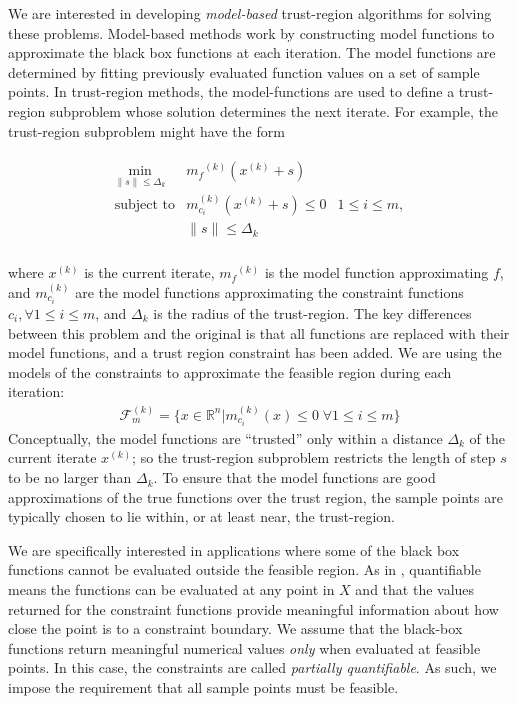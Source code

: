 \documentclass{article}
\theoremstyle{case}
\numberwithin{theorem}{subsection}
\newcommand{\dk}{\Delta_k}
\newcommand{\feasiblek}{{\mathcal F_m^{(k)}}}
\newcommand{\mcik}{{{m}^{(k)}_{c_i}}}
\newcommand{\mfk}{{{m}_f}^{(k)}}
\newcommand{\Rn}{\mathbb R^n}
\newcommand{\xk}{x^{(k)}}
\begin{document}
We are interested in developing {\em model-based} trust-region algorithms for solving these problems.
Model-based methods work by constructing model functions to approximate the black box functions at each iteration.
The model functions are determined by fitting previously evaluated function values on a set of sample points.
In trust-region methods, the model-functions are used to define a trust-region subproblem whose solution determines the next iterate.
For example, the trust-region subproblem might have the form

\begin{align*}
\begin{array}{ccl} \min_{\|s\| \le \dk}
 & \mfk \left(\xk+s\right) \\
\mbox{subject to} & \mcik\left(\xk + s\right) \le 0 & 1 \le i \le m, \\
& \|s\| \le \dk \\
\end{array}
\end{align*}

where $\xk$ is the current iterate, $\mfk$ is the model function approximating $f$, 
and $\mcik$ are the model functions approximating the constraint functions $c_i, \forall 1 \le i \le m$, and $\dk$ is the radius of the trust-region.
The key differences between this problem and the original is that all functions are replaced with their model functions, and a trust region constraint has been added.
We are using the models of the constraints to approximate the feasible region during each iteration:
\begin{align}
\feasiblek = \{x \in \Rn | \mcik(x) \le 0 \; \forall 1 \le i \le m \} \label{define_feasiblek}
\end{align}
Conceptually, the model functions are ``trusted'' only within a distance $ \dk $ of the current iterate $\xk$; so the trust-region subproblem restricts the length of step $s$ to be no larger than $\dk$.
To ensure that the model functions are good approximations of the true functions over the trust region, the sample points are typically chosen to lie within, or at least near, the trust-region.


We are specifically interested in applications where some of the black box functions cannot be evaluated outside the feasible region.
As in \cite{digabel2015taxonomy}, quantifiable means the functions can be evaluated at any point in $X$ and that the values returned for the constraint functions provide meaningful information about how close the point is to a constraint boundary.
We assume that the black-box functions return meaningful numerical values \emph{only} when evaluated at feasible points.
In this case, the constraints are called {\em partially quantifiable}.   
As such, we impose the requirement that all sample points must be feasible.
\end{document}
